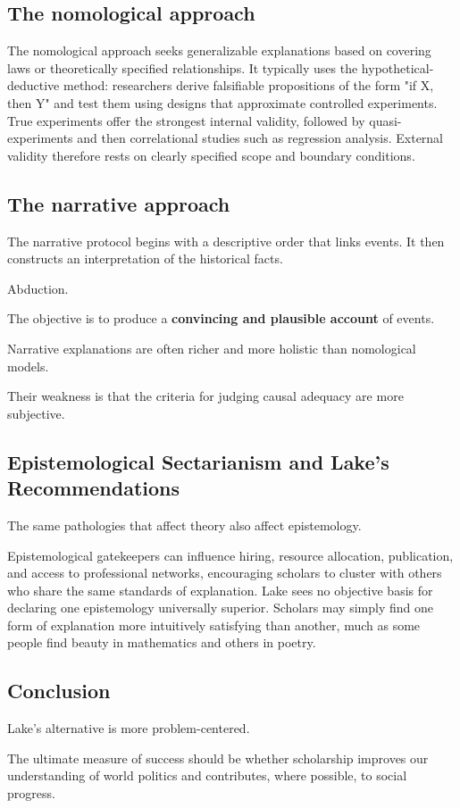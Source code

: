 \subsection{The nomological approach}

The nomological approach seeks generalizable explanations based on
covering laws or theoretically specified relationships. It typically
uses the hypothetical-deductive method: researchers derive falsifiable
propositions of the form "if X, then Y" and test them using designs
that approximate controlled experiments. True experiments offer the
strongest internal validity, followed by quasi-experiments and then
correlational studies such as regression analysis. External validity therefore rests on clearly specified scope and boundary conditions.

\subsection{The narrative approach}

The narrative protocol begins with
a descriptive order that links events. It then constructs an interpretation of the historical facts.

Abduction.

The objective is to produce a \textbf{convincing
and plausible account} of events.

Narrative
explanations are often richer and more holistic than nomological models.

Their weakness is that the criteria for
judging causal adequacy are more subjective.

\subsection{Epistemological Sectarianism and Lake's
Recommendations}

The same pathologies that affect theory also affect epistemology.

Epistemological gatekeepers
can influence hiring, resource allocation, publication, and access to
professional networks, encouraging scholars to cluster with others who
share the same standards of explanation. Lake sees no objective basis
for declaring one epistemology universally superior. Scholars may simply
find one form of explanation more intuitively satisfying than another,
much as some people find beauty in mathematics and others in poetry.

\subsection{Conclusion}
Lake's alternative is more problem-centered.

The ultimate measure of success should be whether scholarship improves our understanding of world politics and contributes, where possible, to social progress.
